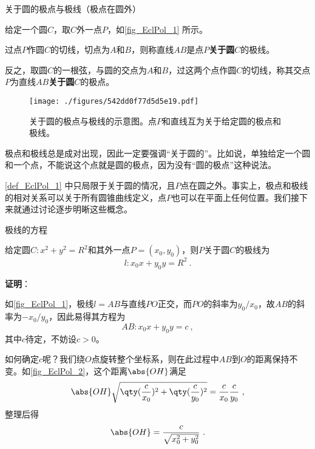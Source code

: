 





\begin{definition}{关于圆的极点与极线（极点在圆外）}\label{def_EclPol_1}

给定一个圆$C$，取$C$外一点$P$，如\autoref{fig_EclPol_1} 所示。

过点$P$作圆$C$的切线，切点为$A$和$B$，则称直线$AB$是点$P$\textbf{关于圆}$C$的极线。

反之，取圆$C$的一根弦，与圆的交点为$A$和$B$，过这两个点作圆$C$的切线，称其交点$P$为直线$AB$\textbf{关于圆}$C$的极点。

\begin{figure}[ht]
\centering
\texttt{[image: ./figures/542dd0f77d5d5e19.pdf]}
\caption{关于圆的极点与极线的示意图。点$P$和直线互为关于给定圆的极点和极线。} \label{fig_EclPol_1}
\end{figure}

\end{definition}




极点和极线总是成对出现，因此一定要强调“关于圆的”。比如说，单独给定一个圆和一个点，不能说这个点就是圆的极点，因为没有“圆的极点”这种说法。

\autoref{def_EclPol_1} 中只局限于关于圆的情况，且$P$点在圆之外。事实上，极点和极线的相对关系可以关于所有圆锥曲线定义，点$P$也可以在平面上任何位置。我们接下来就通过讨论逐步明晰这些概念。




\begin{theorem}{极线的方程}\label{the_EclPol_1}

给定圆$C:x^2+y^2=R^2$和其外一点$P=(x_0, y_0)$，则$P$关于圆$C$的极线为
\begin{equation}
l: x_0x+y_0y = R^2~. 
\end{equation}

\end{theorem}



\textbf{证明}：

如\autoref{fig_EclPol_1}，极线$l=AB$与直线$PO$正交，而$PO$的斜率为$y_0/x_0$，故$AB$的斜率为$-x_0/y_0$，因此易得其方程为
\begin{equation}
AB: x_0x+y_0y=c~, 
\end{equation}
其中$c$待定，不妨设$c>0$。

如何确定$c$呢？我们绕$O$点旋转整个坐标系，则在此过程中$AB$到$O$的距离保持不变。如\autoref{fig_EclPol_2}，这个距离$\abs{OH}$满足
\begin{equation}
\abs{OH}\sqrt{\qty(\frac{c}{x_0})^2+\qty(\frac{c}{y_0})^2} = \frac{c}{x_0}\frac{c}{y_0}~, 
\end{equation}
整理后得
\begin{equation}
\abs{OH}=\frac{c}{\sqrt{x_0^2+y_0^2}}~. 
\end{equation}


